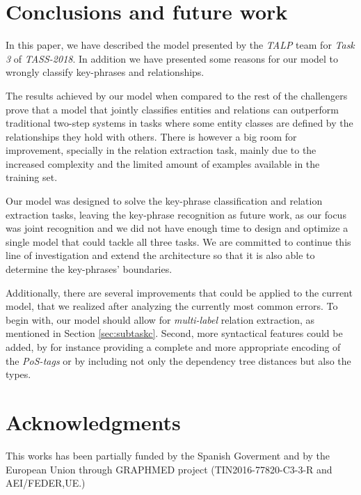 \documentclass[a4paper,11pt,twocolumn,twoside]{article}
\begin{document}
\section{Conclusions and future work}

In this paper, we have described the model presented by the \emph{TALP} team for \emph{Task 3} of \emph{TASS-2018}. In addition we have presented some reasons for our model to wrongly classify key-phrases and relationships.

The results achieved by our model when compared to the rest of the challengers prove that a model that jointly classifies entities and relations can outperform traditional two-step systems in tasks where some entity classes are defined by the relationships they hold with others. There is however a big room for improvement, specially in the relation extraction task, mainly due to the increased complexity and the limited amount of examples available in the training set.

Our model was designed to solve the key-phrase classification and relation extraction tasks, leaving the key-phrase recognition as future work, as our focus was joint recognition and we did not have enough time to design and optimize a single model that could tackle all three tasks. We are committed to continue this line of investigation and extend the architecture so that it is also able to determine the key-phrases' boundaries.

Additionally, there are several improvements that could be applied to the current model, that we realized after analyzing the currently most common errors. To begin with, our model should allow for \emph{multi-label} relation extraction, as mentioned in Section \ref{sec:subtaskc}. Second, more syntactical features could be added, by for instance providing a complete and more appropriate encoding of the \emph{PoS-tags} or by including not only the dependency tree distances but also the types. 

\section*{Acknowledgments}
This works has been partially funded by the Spanish Goverment and by the European Union through GRAPHMED project (TIN2016-77820-C3-3-R and AEI/FEDER,UE.)



\end{document}
